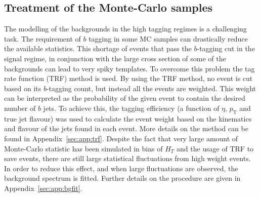 \documentclass[a4paper,11pt]{article}
\newcommand{\pt}{\ensuremath{p_{\text{T}}}}
\newcommand*{\hht}{\ensuremath{H_{\ensuremath{T}}}}
\begin{document}
\subsection{Treatment of the Monte-Carlo samples}
\label{subsec:mctreat}
The modelling of the backgrounds in the high tagging regimes is a challenging task. The requirement of $b$ tagging in some MC samples can drastically reduce the available statistics.
This shortage of events that pass the $b$-tagging cut in the signal regime, in conjunction with the large cross section of some of the backgrounds can lead to very spiky templates.
To overcome this problem the tag rate function (TRF) method is used. By using the TRF method, no event is cut based on its $b$-tagging count, but instead all the events are weighted.
This weight can be interpreted as the probability of the given event to contain the desired number of $b$ jets.
To achieve this, the tagging efficiency (a function of $\eta$, $\pt$ and true jet flavour) was
used to calculate the event weight based on the kinematics and flavour of the jets found in each event. More details on the method can be found in Appendix~\ref{sec:app:trf}.
Despite the fact that very large amount of Monte-Carlo statistic has been simulated in bins of $\hht$
and the usage of TRF to save events, there are still large statistical fluctuations from high weight events.
In order to reduce this effect, and when large fluctuations are observed, the background spectrum is fitted. Further details on the procedure are given in Appendix~\ref{sec:app:bgfit}.

\end{document}
